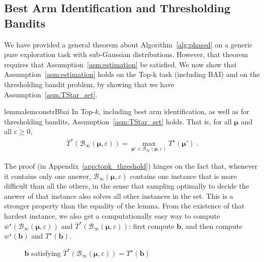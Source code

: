 \subsection{Best Arm Identification and Thresholding Bandits}

We have provided a general theorem about Algorithm~\ref{alg:phased} on a generic pure exploration task with sub-Gaussian distributions.
However, that theorem requires that Assumption~\ref{asm:estimation} be satisfied.
We now show that Assumption~\ref{asm:estimation} holds on the Top-k task (including BAI) and on the thresholding bandit problem, by showing that we have Assumption~\ref{asm:TStar_set}.



\begin{restatable}[]{lemma}{lemconstrBbai}\label{lem:constrBbai}
	In Top-$k$, including best arm identification, as well as for thresholding bandits, Assumption~\ref{asm:TStar_set} holds.
	That is, for all $\bm\mu$ and all $\varepsilon \ge 0$,
	\begin{align*}
		\overline{T}^\star( \mathcal B_{\infty}(\bm\mu, \varepsilon))
		= \max_{\bm\mu' \in \mathcal B_{\infty}(\bm\mu, \varepsilon)} T^\star(\bm\mu')
		\: .
	\end{align*}
\end{restatable}


The proof (in Appendix~\ref{app:topk_threshold}) hinges on the fact that, whenever it contains only one answer, $\mathcal{B}_\infty(\bm\mu,\varepsilon)$ contains one instance that is more difficult than all the others, in the sense that sampling optimally to decide the answer of that instance also solves all other instances in the set.
This is a stronger property than the equality of the lemma.
From the existence of that hardest instance, we also get a computationally easy way to compute $\overline{w}^\star(\mathcal{B}_\infty(\bm\mu,\varepsilon))$ and $\overline{T}^\star(\mathcal{B}_\infty(\bm\mu,\varepsilon))$: first compute $\bm b$, and then compute $w^\star(\bm b)$ and $T^\star(\bm b)$.

\begin{figure}[!ht]
	\centering
	\caption{$\bm b$ satisfying $\overline{T}^\star(\mathcal{B}_\infty(\bm\mu,\varepsilon))=T^\star(\bm b)$}
	\label{fig:box}
\end{figure}


